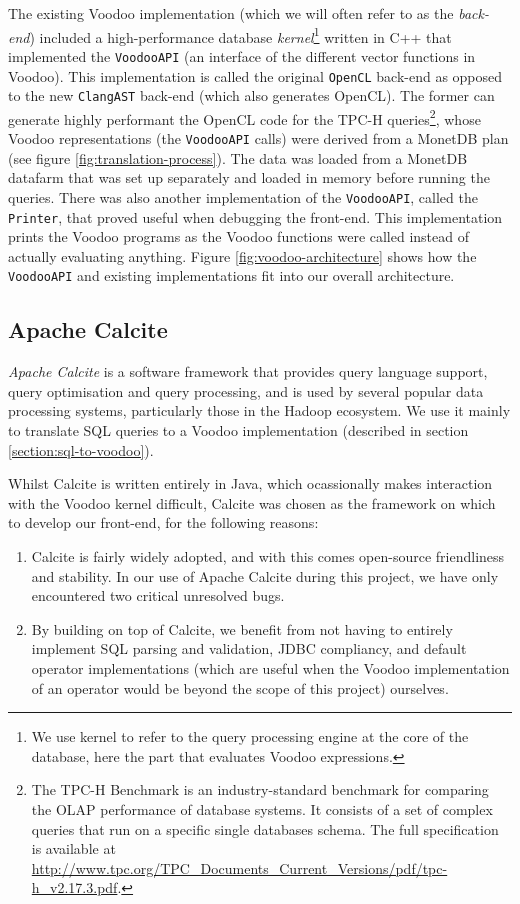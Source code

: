 The existing Voodoo implementation (which we will often refer to as the \emph{back-end}) included a high-performance database \emph{kernel}\footnote{We use kernel to refer to the query processing engine at the core of the database, here the part that evaluates Voodoo expressions.} written in C++ that implemented the \texttt{VoodooAPI} (an interface of the different vector functions in Voodoo). This implementation is called the original \texttt{OpenCL} back-end as opposed to the new \texttt{ClangAST} back-end (which also generates OpenCL). The former can generate highly performant the OpenCL code for the TPC-H queries\footnote{The TPC-H Benchmark is an industry-standard benchmark for comparing the OLAP performance of database systems. It consists of a set of complex queries that run on a specific single databases schema. The full specification is available at \url{http://www.tpc.org/TPC_Documents_Current_Versions/pdf/tpc-h_v2.17.3.pdf}.}, whose Voodoo representations (the \texttt{VoodooAPI} calls) were derived from a MonetDB plan (see figure \ref{fig:translation-process}). The data was loaded from a MonetDB datafarm that was set up separately and loaded in memory before running the queries. There was also another implementation of the \texttt{VoodooAPI}, called the \texttt{Printer}, that proved useful when debugging the front-end. This implementation prints the Voodoo programs as the Voodoo functions were called instead of actually evaluating anything. Figure \ref{fig:voodoo-architecture} shows how the \texttt{VoodooAPI} and existing implementations fit into our overall architecture.

\subsection{Apache Calcite}

\emph{Apache Calcite} \cite{Begoli:2018:ACF:3183713.3190662} is a software framework that provides query language support, query optimisation and query processing, and is used by several popular data processing systems, particularly those in the Hadoop ecosystem. We use it mainly to translate SQL queries to a Voodoo implementation (described in section \ref{section:sql-to-voodoo}).

Whilst Calcite is written entirely in Java, which ocassionally makes interaction with the Voodoo kernel difficult, Calcite was chosen as the framework on which to develop our front-end, for the following reasons:

\begin{enumerate}
    \item Calcite is fairly widely adopted, and with this comes open-source friendliness and stability. In our use of Apache Calcite during this project, we have only encountered two critical unresolved bugs.
    \item By building on top of Calcite, we benefit from not having to entirely implement SQL parsing and validation, JDBC compliancy, and default operator implementations (which are useful when the Voodoo implementation of an operator would be beyond the scope of this project) ourselves.
\end{enumerate}
 
